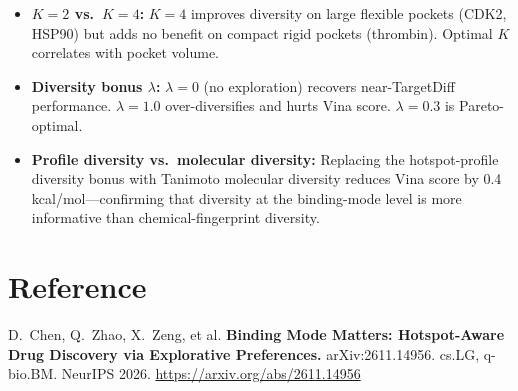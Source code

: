 \documentclass[10pt,twocolumn]{article}
\begin{document}
\begin{itemize}[leftmargin=1em,itemsep=2pt]
  \item \textbf{$K=2$ vs.\ $K=4$:} $K=4$ improves diversity on large flexible pockets (CDK2, HSP90) but adds no benefit on compact rigid pockets (thrombin). Optimal $K$ correlates with pocket volume.
  \item \textbf{Diversity bonus $\lambda$:} $\lambda=0$ (no exploration) recovers near-TargetDiff performance. $\lambda=1.0$ over-diversifies and hurts Vina score. $\lambda=0.3$ is Pareto-optimal.
  \item \textbf{Profile diversity vs.\ molecular diversity:} Replacing the hotspot-profile diversity bonus with Tanimoto molecular diversity reduces Vina score by 0.4 kcal/mol---confirming that diversity at the binding-mode level is more informative than chemical-fingerprint diversity.
\end{itemize}

\section*{Reference}
D.\ Chen, Q.\ Zhao, X.\ Zeng, et al.
\textbf{Binding Mode Matters: Hotspot-Aware Drug Discovery via Explorative Preferences.}
arXiv:2611.14956. cs.LG, q-bio.BM. NeurIPS 2026.
\url{https://arxiv.org/abs/2611.14956}
\end{document}
